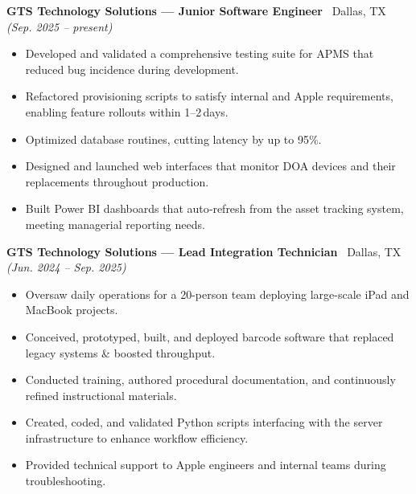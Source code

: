 \documentclass[class=article, crop=false]{standalone}
\begin{document}
\textbf{GTS Technology Solutions --- Junior Software Engineer} \textbar\ Dallas, TX
\hfill \textsl{(Sep. 2025 -- present)}

\begin{itemize}[leftmargin=*]
    \item Developed and validated a comprehensive testing suite for APMS that 
    reduced bug incidence during development.
    
    \item Refactored provisioning scripts to satisfy internal and Apple 
    requirements, enabling feature rollouts within 1–2 days.

    \item Optimized database routines, cutting latency by up to 95\%.

    \item Designed and launched web interfaces that monitor DOA devices and 
    their replacements throughout production.

    \item Built Power BI dashboards that auto‑refresh from the asset tracking 
    system, meeting managerial reporting needs.
\end{itemize}
\split


\textbf{GTS Technology Solutions --- Lead Integration Technician} \textbar\ Dallas, TX
\hfill \textsl{(Jun. 2024 -- Sep. 2025)}

\begin{itemize}[leftmargin=*]
    \item Oversaw daily operations for a 20-person team deploying large-scale
    iPad and MacBook projects.

    \item Conceived, prototyped, built, and deployed barcode software that 
    replaced legacy systems \& boosted throughput.
    
    \item Conducted training, authored procedural documentation, and 
    continuously refined instructional materials.

    \item Created, coded, and validated Python scripts interfacing with the 
    server infrastructure to enhance workflow efficiency.

    \item Provided technical support to Apple engineers and internal teams 
    during troubleshooting.
\end{itemize}
\split
\end{document}
